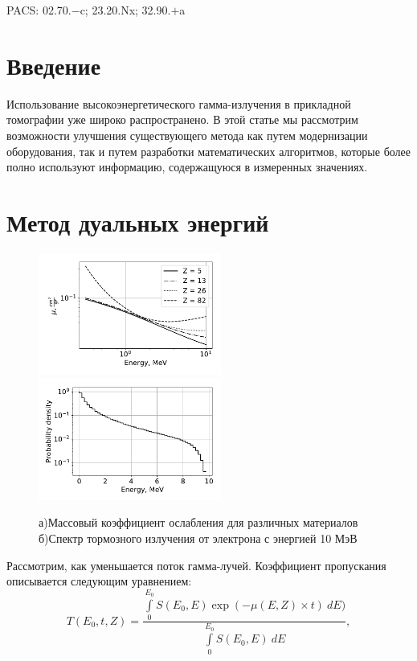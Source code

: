 \documentclass[a4paper]{panl}
\begin{document}
\noindent
PACS: 02.70.$-$c; 23.20.Nx; 32.90.$+$a

\newpage
\label{sec:intro}
\section*{Введение}
Использование высокоэнергетического гамма-излучения в прикладной томографии уже широко распространено. В этой статье мы рассмотрим возможности улучшения существующего метода как путем модернизации оборудования, так и путем разработки математических алгоритмов, которые более полно используют информацию, содержащуюся в измеренных значениях.
\section*{Метод дуальных энергий}
\begin{figure}[t]
    \begin{center}
        \includegraphics[width=60mm]{figures/Attenuation.pdf} 
        \includegraphics[width=60mm]{figures/Bremsstrahlung.pdf}  
        \vspace{-3mm}
        \caption{а)Массовый коэффициент ослабления для различных материалов б)Спектр тормозного излучения от электрона с энергией 10 МэВ}
    \end{center}
    \vspace{-5mm}
\end{figure}
Рассмотрим, как уменьшается поток гамма-лучей. Коэффициент пропускания описывается следующим уравнением:
\begin{equation}
\label{eq:trans}
T(E_0, t, Z) = \frac{\int \limits_0^{E_0} S(E_0, E) \exp(-\mu(E,Z)\times t)~dE)}{\int \limits_0^{E_0} S(E_0, E)~dE},
\end{equation}
\end{document}

